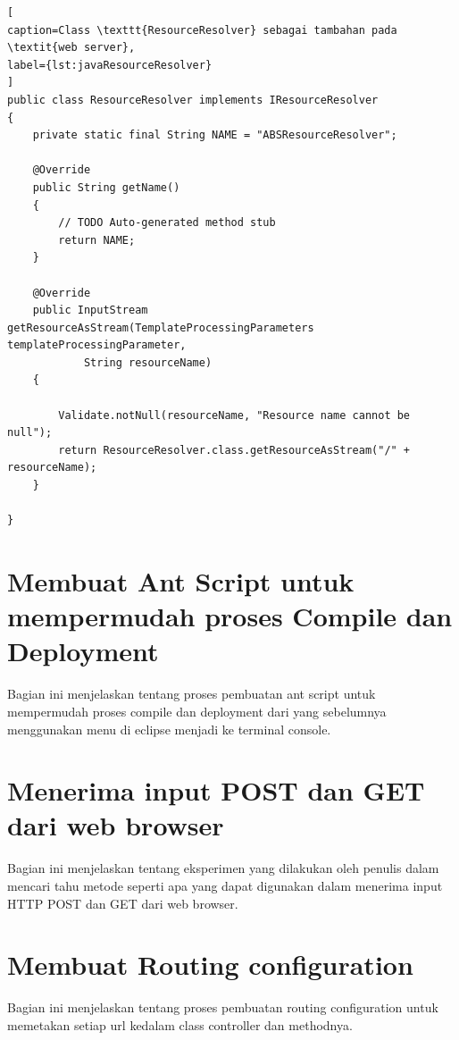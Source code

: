 \begin{lstlisting}[
caption=Class \texttt{ResourceResolver} sebagai tambahan pada \textit{web server},
label={lst:javaResourceResolver}
]
public class ResourceResolver implements IResourceResolver
{
	private static final String NAME = "ABSResourceResolver";
	
	@Override
	public String getName() 
	{
		// TODO Auto-generated method stub
		return NAME;
	}

	@Override
	public InputStream getResourceAsStream(TemplateProcessingParameters templateProcessingParameter,
			String resourceName) 
	{
		
		Validate.notNull(resourceName, "Resource name cannot be null");
		return ResourceResolver.class.getResourceAsStream("/" + resourceName);
	}

}
\end{lstlisting}

\section{Membuat Ant Script untuk mempermudah proses Compile dan Deployment}
Bagian ini menjelaskan tentang proses pembuatan ant script untuk mempermudah proses compile dan deployment dari yang sebelumnya menggunakan menu di eclipse menjadi ke terminal console.

\section{Menerima input POST dan GET dari web browser}
Bagian ini menjelaskan tentang eksperimen yang dilakukan oleh penulis dalam mencari tahu metode seperti apa yang dapat digunakan dalam menerima input HTTP POST dan GET dari web browser.

\section{Membuat Routing configuration}
Bagian ini menjelaskan tentang proses pembuatan routing configuration untuk memetakan setiap url kedalam class controller dan methodnya.